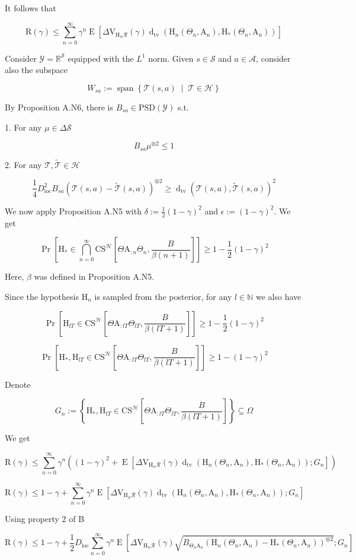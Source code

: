 \documentclass[a4paper]{article}
\DeclareMathOperator{\Sp}{span}
\newcommand{\AP}[1]{\left(#1\right)}
\newcommand{\AB}[1]{\left[#1\right]}
\newcommand{\AC}[1]{\left\{#1\right\}}
\newcommand{\ACM}[2]{\left\{#1\;\middle\vert\;#2\right\}}
\newcommand{\Pa}[2]{\underset{#1}{\operatorname{Pr}}\AB{#2}}
\newcommand{\Ea}[2]{\underset{#1}{\operatorname{E}}\AB{#2}}
\newcommand{\Dtva}[1]{\operatorname{d}_{\text{tv}}\AP{#1}}
\newcommand{\Nats}{\mathbb{N}}
\newcommand{\Reals}{\mathbb{R}}
\newcommand{\PSD}{\mathrm{PSD}}
\newcommand{\B}{B}
\newcommand{\Y}{\mathcal{Y}}
\newcommand{\St}{\mathcal{S}}
\newcommand{\A}{\mathcal{A}}
\newcommand{\R}{\mathcal{R}}
\newcommand{\T}{\mathcal{T}}
\newcommand{\Hy}{\mathcal{H}}
\newcommand{\DL}{D_{\mathrm{loc}}}
\newcommand{\V}{\mathrm{V}}
\newcommand{\Reg}{\mathrm{R}}
\newcommand{\CS}{\mathrm{CS}}
\newcommand{\AT}{\mathrm{A}}
\newcommand{\THy}{\mathrm{H}_*}
\newcommand{\SHy}{\mathrm{H}}
\newcommand{\CSE}{G}
\begin{document}
It follows that

$$\Reg(\gamma)\leq\sum_{n=0}^\infty\gamma^{n}\Ea{}{\Delta\V_{\SHy_n\R}(\gamma)\Dtva{\SHy_n\AP{\Theta_n,\AT_n},\THy\AP{\Theta_n,\AT_n}} }$$

Consider $\Y=\Reals^\St$ equipped with the $L^1$ norm. Given $s\in\St$ and $a\in\A$, consider also the subspace

$$W_{sa}:=\Sp\ACM{\T(s,a)}{\T\in\Hy}$$

By Proposition A.N6, there is $\B_{sa}\in\PSD\AP{\Y}$ s.t.

1. For any $\mu\in\Delta\St$

$$\B_{sa}\mu^{\otimes2}\leq1$$

2. For any $\T,\tilde{\T}\in\Hy$

$$\frac{1}{4}\DL^2 B_{sa}\AP{\T(s,a)-\tilde{\T}(s,a)}^{\otimes2} \geq \Dtva{\T(s,a),\tilde{\T}(s,a)}^2$$

We now apply Proposition A.N5 with $\delta:=\frac{1}{2}(1-\gamma)^2$ and $\epsilon:=(1-\gamma)^2$. We get

$$\Pa{}{\SHy_*\in\bigcap_{n=0}^\infty\CS^\Hy\AB{\Theta\AT_{:n}\Theta_n,\frac{\B }{\beta(n+1)}}} \geq 1-\frac{1}{2}(1-\gamma)^2$$

Here, $\beta$ was defined in Proposition A.N5.

Since the hypothesis $\SHy_n$ is sampled from the posterior, for any $l\in\Nats$ we also have

$$\Pa{}{\SHy_{lT}\in\CS^\Hy\AB{\Theta\AT_{:lT}\Theta_{lT},\frac{\B }{\beta(lT+1)}}} \geq 1-\frac{1}{2}(1-\gamma)^2$$

$$\Pa{}{\SHy_*,\SHy_{lT}\in\CS^\Hy\AB{\Theta\AT_{:lT}\Theta_{lT},\frac{\B }{\beta(lT+1)}}} \geq 1-(1-\gamma)^2$$

Denote

$$\CSE_n:=\AC{\SHy_*,\SHy_{lT}\in\CS^\Hy\AB{\Theta\AT_{:lT}\Theta_{lT},\frac{\B }{\beta(lT+1)}}}\subseteq\Omega$$

We get

$$\Reg(\gamma)\leq\sum_{n=0}^\infty\gamma^{n}\AP{(1-\gamma)^2+\Ea{}{\Delta\V_{\SHy_n\R}(\gamma)\Dtva{\SHy_n\AP{\Theta_n,\AT_n},\THy\AP{\Theta_n,\AT_n}};\CSE_n }}$$

$$\Reg(\gamma)\leq1-\gamma+\sum_{n=0}^\infty\gamma^{n}\Ea{}{\Delta\V_{\SHy_n\R}(\gamma)\Dtva{\SHy_n\AP{\Theta_n,\AT_n},\THy\AP{\Theta_n,\AT_n}};\CSE_n }$$

Using property 2 of B

$$\Reg(\gamma)\leq1-\gamma+\frac{1}{2}\DL\sum_{n=0}^\infty\gamma^{n}\Ea{}{\Delta\V_{\SHy_n\R}(\gamma)\sqrt{B_{\Theta_n\AT_n}\AP{\SHy_n\AP{\Theta_n,\AT_n}-\THy\AP{\Theta_n,\AT_n}}^{\otimes2}};\CSE_n }$$
\end{document}
